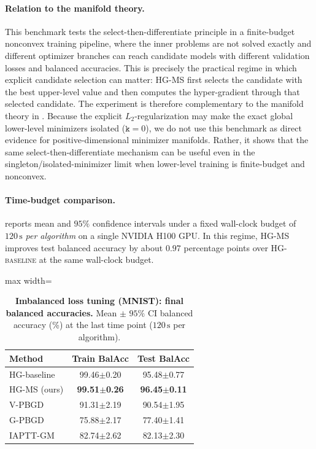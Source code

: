 \documentclass{article}
\theoremstyle{normaltheorem}
\newcommand{\dimk}{\texttt{k}}
\begin{document}
\paragraph{Relation to the manifold theory.}
This benchmark tests the select-then-differentiate principle in a finite-budget nonconvex training pipeline, where the
inner problems are not solved exactly and different optimizer branches can reach candidate models with different
validation losses and balanced accuracies. This is precisely the practical regime in which explicit candidate selection
can matter: \textsc{HG-MS} first selects the candidate with the best upper-level value and then computes the hyper-gradient
through that selected candidate. The experiment is therefore complementary to the manifold theory in .
Because the explicit \(L_2\)-regularization may make the exact global lower-level minimizers isolated (\(\dimk=0\)), we do
not use this benchmark as direct evidence for positive-dimensional minimizer manifolds. Rather, it shows that the same
select-then-differentiate mechanism can be useful even in the singleton/isolated-minimizer limit when lower-level training
is finite-budget and nonconvex.


\paragraph{Time-budget comparison.}
 reports mean and $95\%$ confidence intervals under a fixed wall-clock budget of $120\,\mathrm{s}$
\emph{per algorithm} on a single NVIDIA H100 GPU.
In this regime, \textsc{HG-MS} improves test balanced accuracy by about $0.97$ percentage points over
\textsc{HG-baseline} at the same wall-clock budget.

\begin{table}[t]
  \centering
  \caption{\textbf{Imbalanced loss tuning (MNIST): final balanced accuracies.}
  Mean $\pm$ $95\%$ CI balanced accuracy (\%) at the last time point ($120\,\mathrm{s}$ per algorithm).}
  \label{tab:imb-acc}
  \begin{adjustbox}{max width=\linewidth}
  \begin{tabular}{lcc}
    \toprule
    Method & Train BalAcc & Test BalAcc \\
    \midrule
    HG-baseline       & 99.46$\pm$0.20 & 95.48$\pm$0.77 \\
    HG-MS (ours)      & \textbf{99.51$\pm$0.26} & \textbf{96.45$\pm$0.11} \\
    V-PBGD            & 91.31$\pm$2.19 & 90.54$\pm$1.95 \\
    G-PBGD            & 75.88$\pm$2.17 & 77.40$\pm$1.41 \\
    IAPTT-GM          & 82.74$\pm$2.62 & 82.13$\pm$2.30 \\
    \bottomrule
  \end{tabular}
  \end{adjustbox}
\end{table}
\end{document}

